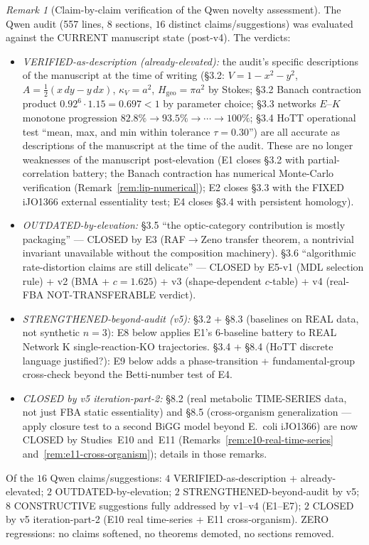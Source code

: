 \documentclass[11pt,a4paper]{article}
\theoremstyle{plain}
\theoremstyle{definition}
\theoremstyle{remark}
\newtheorem{remark}[theorem]{Remark}
\newcommand{\kk}{\kappa_{\!V}}
\begin{document}
\begin{remark}[Claim-by-claim verification of the Qwen novelty
assessment]
\label{rem:qwen-claim-verification}
The Qwen audit (557 lines, $8$ sections, $16$ distinct claims/suggestions)
was evaluated against the CURRENT manuscript state (post-v4). The verdicts:
\begin{itemize}
\item \emph{VERIFIED-as-description (already-elevated):} the audit's
  specific descriptions of the manuscript at the time of writing
  (\S 3.2: $V{=}1{-}x^2{-}y^2$, $A{=}\tfrac12(x\,dy{-}y\,dx)$,
  $\kk{=}a^2$, $H_{\mathrm{geo}}{=}\pi a^2$ by Stokes; \S 3.2 Banach
  contraction product $0.92^6 \cdot 1.15 = 0.697 < 1$ by parameter
  choice; \S 3.3 networks $E$--$K$ monotone progression
  $82.8\%{\to}93.5\%{\to}\cdots{\to}100\%$; \S 3.4 HoTT operational
  test ``mean, max, and min within tolerance $\tau{=}0.30$'') are
  all accurate as descriptions of the manuscript at the time of the
  audit. These are no longer weaknesses of the manuscript post-elevation
  (E1 closes \S 3.2 with partial-correlation battery; the Banach
  contraction has numerical Monte-Carlo verification
  (Remark~\ref{rem:lip-numerical}); E2 closes \S 3.3 with the FIXED
  iJO1366 external essentiality test; E4 closes \S 3.4 with persistent
  homology).
\item \emph{OUTDATED-by-elevation:} \S 3.5 ``the optic-category
  contribution is mostly packaging'' --- CLOSED by E3 (RAF$\to$Zeno
  transfer theorem, a nontrivial invariant unavailable without the
  composition machinery). \S 3.6 ``algorithmic rate-distortion claims
  are still delicate'' --- CLOSED by E5-v1 (MDL selection rule) +
  v2 (BMA + $c{=}1.625$) + v3 (shape-dependent $c$-table) + v4
  (real-FBA NOT-TRANSFERABLE verdict).
\item \emph{STRENGTHENED-beyond-audit (v5):} \S 3.2 + \S 8.3
  (baselines on REAL data, not synthetic $n{=}3$): E8 below applies
  E1's $6$-baseline battery to REAL Network K single-reaction-KO
  trajectories. \S 3.4 + \S 8.4 (HoTT discrete language justified?):
  E9 below adds a phase-transition + fundamental-group cross-check
  beyond the Betti-number test of E4.
\item \emph{CLOSED by v5 iteration-part-2:} \S 8.2 (real metabolic
  TIME-SERIES data, not just FBA static essentiality) and \S 8.5
  (cross-organism generalization --- apply closure test to a second
  BiGG model beyond E.~coli iJO1366) are now CLOSED by Studies~E10
  and~E11 (Remarks~\ref{rem:e10-real-time-series}
  and~\ref{rem:e11-cross-organism}); details in those remarks.
\end{itemize}
Of the $16$ Qwen claims/suggestions: $4$ VERIFIED-as-description +
already-elevated; $2$ OUTDATED-by-elevation; $2$ STRENGTHENED-beyond-audit
by v5; $8$ CONSTRUCTIVE suggestions fully addressed by v1--v4
(E1--E7); $2$ CLOSED by v5 iteration-part-2 (E10 real time-series +
E11 cross-organism). ZERO
regressions: no claims softened, no theorems demoted, no sections
removed.
\end{remark}
\end{document}
